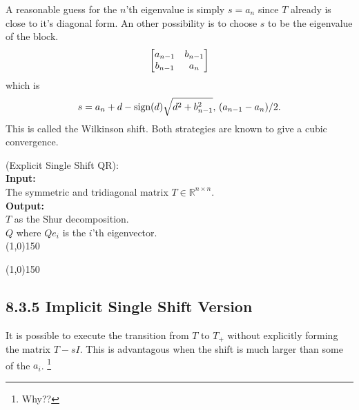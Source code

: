 A reasonable guess for the $n$'th eigenvalue is simply $s=a_n$ since $T$ already is close to it's
diagonal form. An other possibility is to choose $s$ to be the eigenvalue of the block.
\begin{equation}
	\left[\begin{matrix} a_{n-1}&b_{n-1}\\b_{n-1}&a_n \end{matrix}\right]
\end{equation}  
which is 
\begin{equation}
	s=a_n+d-\text{sign}{}(d)\sqrt{d^2+b_{n-1}^2},\,(a_{n-1}-a_n)/2.
\end{equation}
This is called the Wilkinson shift.
%
Both strategies are known to give a cubic convergence.
%
%
\begin{algo}
{
%
	(Explicit Single Shift QR):
%
}\\
\textbf{Input: }
{
%
	\\The symmetric and tridiagonal matrix $T\in\mathbb R^{n\times n}$.
%
}\\
\textbf{Output: }
{
%
	\\$T$ as the Shur decomposition.
	\\$Q$ where $Qe_i$ is the $i$'th eigenvector.
%
}\\
\line(1,0){150}
\begin{algorithmic}
%
\EndFor{}
%
\end{algorithmic}
\label{algQRSingleShiflExplicit}
\line(1,0){150}
\end{algo}
%



\subsection*{8.3.5 Implicit Single Shift Version}%

It is possible to execute the transition from $T$ to $T_+$ without explicitly forming the matrix
$T-sI$. This is advantagous when the shift is much larger than some of the $a_i$. 
\footnote{Why??}



